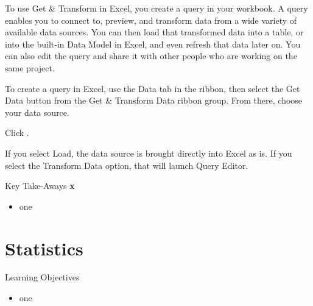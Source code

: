 To use Get \& Transform in Excel, you create a query in your workbook. A query enables you to connect to, preview, and transform data from a wide variety of available data sources. You can then load that transformed data into a table, or into the built-in Data Model in Excel, and even refresh that data later on. You can also edit the query and share it with other people who are working on the same project.

To create a query in Excel, use the Data tab in the ribbon, then select the Get Data button from the Get \& Transform Data ribbon group. From there, choose your data source. 

Click .

If you select Load, the data source is brought directly into Excel as is. If you select the Transform Data option, that will launch Query Editor.

\begin{center}
	\begin{tkwbox}{Key Take-Aways}
		\textbf{x}
		\\
		\begin{itemize}
			\setlength{\itemsep}{0pt}
			\setlength{\parskip}{0pt}
			\setlength{\parsep}{0pt}
			
			\item one
			
		\end{itemize}
	\end{tkwbox}
\end{center}

\section{Statistics}

\begin{center}
	\begin{objbox}{Learning Objectives}
		\begin{itemize}
			\setlength{\itemsep}{0pt}
			\setlength{\parskip}{0pt}
			\setlength{\parsep}{0pt}
			
			\item one
			
		\end{itemize}
	\end{objbox}
\end{center}







